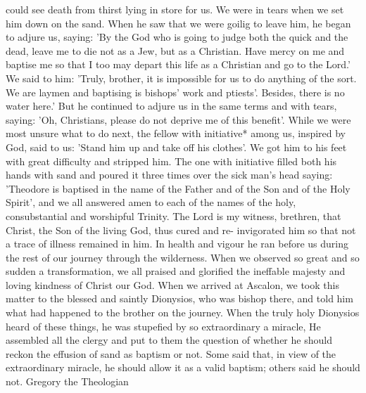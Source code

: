 could see death from thirst lying in store for us.
We were in tears
when we set him down on the sand.
When he saw that we were
goilig to leave him, he began to adjure us, saying: 'By the God who
is going to judge both the quick and the dead, leave me to die not
as a Jew, but as a Christian.
Have mercy on me and baptise me so
that I too may depart this life as a Christian and go to the Lord.'
We said to him: 'Truly, brother, it is impossible for us to do
anything of the sort.
We are laymen and baptising is bishops' work
and ptiests'.
Besides, there is no water here.' But he continued to
adjure us in the same terms and with tears, saying: 'Oh, Christians,
please do not deprive me of this benefit'.
While we were most
unsure what to do next, the fellow with initiative* among us,
inspired by God, said to us: 'Stand him up and take off his clothes'.
We got him to his feet with great difficulty and stripped him.
The
one with initiative filled both his hands with sand and poured it
three times over the sick man's head saying: 'Theodore is baptised
in the name of the Father and of the Son and of the Holy Spirit',
and we all answered amen to each of the names of the holy,
consubstantial and worshipful Trinity.
The Lord is my witness,
brethren, that Christ, the Son of the living God, thus cured and re-
invigorated him so that not a trace of illness remained in him.
In
health and vigour he ran before us during the rest of our journey
through the wilderness.
When we observed so great and so sudden
a transformation, we all praised and glorified the ineffable majesty
and loving kindness of Christ our God.
When we arrived at
Ascalon, we took this matter to the blessed and saintly Dionysios,
who was bishop there, and told him what had happened to the
brother on the journey.
When the truly holy Dionysios heard of
these things, he was stupefied by so extraordinary a miracle, He
assembled all the clergy and put to them the question of whether he
should reckon the effusion of sand as baptism or not.
Some said
that, in view of the extraordinary miracle, he should allow it as a
valid baptism; others said he should not.
Gregory the Theologian

